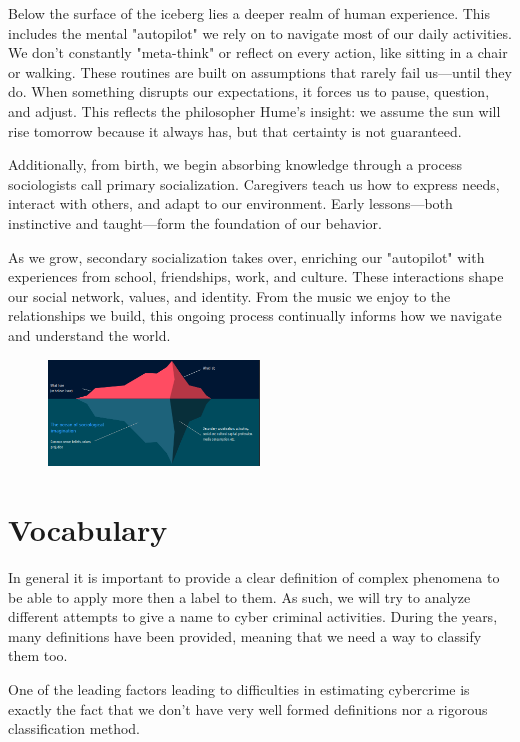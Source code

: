 Below the surface of the iceberg lies a deeper realm of human
experience. This includes the mental "autopilot" we rely on to
navigate most of our daily activities. We don't constantly
"meta-think" or reflect on every action, like sitting in a chair or
walking. These routines are built on assumptions that rarely fail
us—until they do. When something disrupts our expectations, it forces
us to pause, question, and adjust. This reflects the philosopher
Hume's insight: we assume the sun will rise tomorrow because it always
has, but that certainty is not guaranteed.

Additionally, from birth, we begin absorbing knowledge through a
process sociologists call primary socialization. Caregivers teach
us how to express needs, interact with others, and adapt to our
environment. Early lessons—both instinctive and taught—form the
foundation of our behavior.

As we grow, secondary socialization takes over, enriching our
"autopilot" with experiences from school, friendships, work, and
culture. These interactions shape our social network, values, and
identity. From the music we enjoy to the relationships we build, this
ongoing process continually informs how we navigate and understand the
world.

\begin{figure}[H]
  \centering
  \includegraphics[width=0.5\textwidth]{img/sociology iceberg.png}
\end{figure}

\section{Vocabulary}
In general it is important to provide a clear definition of complex
phenomena to be able to apply more then a label to them. As such, we
will try to analyze different attempts to give a name to cyber
criminal activities. During the years, many definitions have been
provided, meaning that we need a way to classify them too.

\begin{boxH}
  One of the leading factors leading to difficulties in estimating
  cybercrime is exactly the fact that we don't have very well formed
  definitions nor a rigorous classification method.
\end{boxH}

